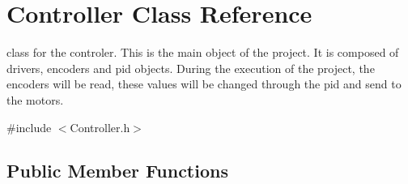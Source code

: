 \hypertarget{class_controller}{}\section{Controller Class Reference}
\label{class_controller}


class for the controler. This is the main object of the project. It is composed of drivers, encoders and pid objects. During the execution of the project, the encoders will be read, these values will be changed through the pid and send to the motors.  




{\ttfamily \#include $<$Controller.\+h$>$}

\subsection*{Public Member Functions}
